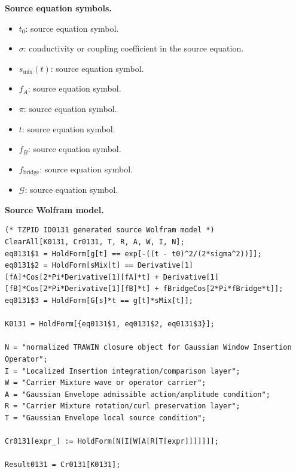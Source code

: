 \begin{minipage}[t]{0.49\linewidth}
\begingroup
\small
\raggedright
\textbf{Source equation symbols.}\par
\begin{itemize}[leftmargin=1.35em,itemsep=1pt,topsep=1pt,parsep=0pt]
    \item $t_0$: source equation symbol.
    \item $\sigma$: conductivity or coupling coefficient in the source equation.
    \item $s_{\mathrm{mix}}(t)$: source equation symbol.
    \item $f_A$: source equation symbol.
    \item $\pi$: source equation symbol.
    \item $t$: source equation symbol.
    \item $f_B$: source equation symbol.
    \item $f_{\mathrm{bridge}}$: source equation symbol.
    \item $\mathcal{G}$: source equation symbol.
\end{itemize}
\endgroup
\end{minipage}\hfill
\begin{minipage}[t]{0.47\linewidth}
\begingroup
\scriptsize
\raggedright
\textbf{Source Wolfram model.}\par
\begin{Verbatim}[fontsize=\tiny,breaklines=true,breakanywhere=true]
(* TZPID ID0131 generated source Wolfram model *)
ClearAll[K0131, Cr0131, T, R, A, W, I, N];
eq0131$1 = HoldForm[g[t] == exp[-((t - t0)^2/(2*sigma^2))]];
eq0131$2 = HoldForm[sMix[t] == Derivative[1][fA]*Cos[2*Pi*Derivative[1][fA]*t] + Derivative[1][fB]*Cos[2*Pi*Derivative[1][fB]*t] + fBridgeCos[2*Pi*fBridge*t]];
eq0131$3 = HoldForm[G[s]*t == g[t]*sMix[t]];

K0131 = HoldForm[{eq0131$1, eq0131$2, eq0131$3}];

N = "normalized TRAWIN closure object for Gaussian Window Insertion Operator";
I = "Localized Insertion integration/comparison layer";
W = "Carrier Mixture wave or operator carrier";
A = "Gaussian Envelope admissible action/amplitude condition";
R = "Carrier Mixture rotation/curl preservation layer";
T = "Gaussian Envelope local source condition";

Cr0131[expr_] := HoldForm[N[I[W[A[R[T[expr]]]]]]];

Result0131 = Cr0131[K0131];
\end{Verbatim}
\endgroup
\end{minipage}

